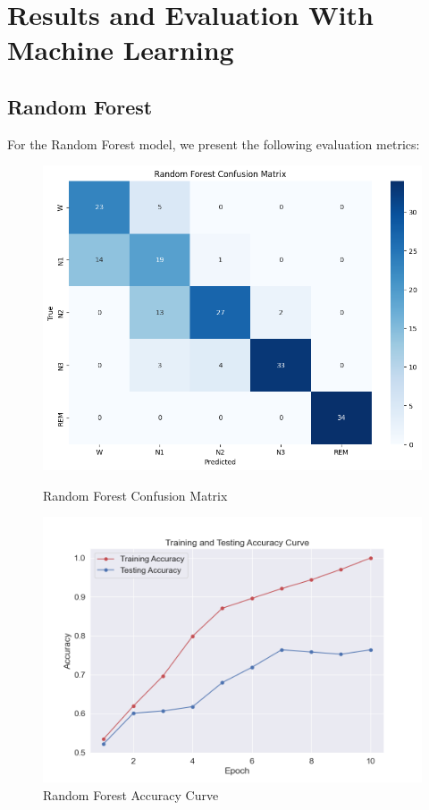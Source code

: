\section{Results and Evaluation With Machine Learning }

 


\subsection{Random Forest}

For the Random Forest model, we present the following evaluation metrics:

\begin{figure}[H]
	\centering
	\begin{minipage}[t]{0.48\textwidth}
		\centering
		\includegraphics[width=\textwidth]{img/paper_1/random_forest_confusion_matrix.png}
		\caption{Random Forest Confusion Matrix}
	\end{minipage}
	\hfill
	\begin{minipage}[t]{0.48\textwidth}
		\centering
		\includegraphics[width=\textwidth]{img/paper_1/accuracy_curve.png}
		\caption{Random Forest Accuracy Curve}
	\end{minipage}
\end{figure}
